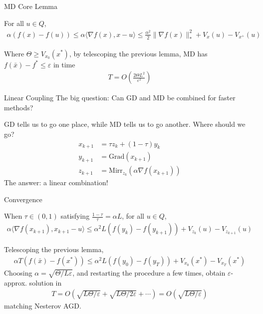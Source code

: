 \documentclass[10pt]{beamer}
\def \ve{\varepsilon}
\newcommand{\mg}[1]{\| #1 \|}
\renewcommand{\grad}{\nabla}
\newcommand{\1}{\mathbbm{1}}
\begin{document}
\begin{frame}{MD Core Lemma}
    \begin{lemma} 
        For all $u \in Q$,
        \begin{align*}
            \alpha (f(x) - f(u)) \leq \alpha \langle \grad f(x), x-u \rangle \leq \frac{\alpha^2}{2} \mg{\grad f(x)}^2_* + V_x(u) - V_{x^+}(u)
        \end{align*}
    \end{lemma}
    \begin{theorem}[]
        Where $\Theta \geq V_{x_0}(x^*)$, by telescoping the previous lemma, MD has $f(\bar x) - f^* \leq \ve$ in time
        \begin{align*}
            T = O\left(\frac{2\Theta L^2}{\ve^2}\right)
        \end{align*}
    \end{theorem}
\end{frame}
\begin{frame}{Linear Coupling}
    The big question: Can GD and MD be combined for faster methods?

    GD tells us to go one place, while MD tells us to go another. Where should we go?
    \begin{align*}
        x_{k+1} &= \tau z_k + (1-\tau) y_k \\
        y_{k+1} &= \mathrm{Grad}(x_{k+1})\\
        z_{k+1} &= \mathrm{Mirr}_{z_k}(\alpha \grad f(x_{k+1}))
    \end{align*}
    The answer: a linear combination!
\end{frame}

\begin{frame}{Convergence}
    \begin{lemma}[Coupling]
        When $\tau \in (0,1)$ satisfying $ \frac{1-\tau}{\tau} = \alpha L$, for all $u \in Q$, \begin{align*}
         \alpha \langle \grad f(x_{k+1}), x_{k+1}-u \rangle \leq \alpha^2 L(f(y_k) - f(y_{k+1})) + V_{z_k}(u) - V_{z_{k+1}}(u)
        \end{align*}
    \end{lemma}
    \begin{theorem}[]
        Telescoping the previous lemma,
        \begin{align*}
            \alpha T(f(\bar x) - f(x^*)) \leq \alpha^2 L(f(y_0) - f(y_T)) + V_{x_0}(x^*) - V_{x_T}(x^*)
        \end{align*}
        Choosing $\alpha = \sqrt{\Theta/L\ve}$, and restarting the procedure a few times, obtain $\ve$-approx. solution in 
        \begin{align*}
            T = O(\sqrt{L\Theta/\ve} + \sqrt{L\Theta/2\ve} + \cdots) = O(\sqrt{L\Theta/\ve})
        \end{align*}
        matching Nesterov AGD.
    \end{theorem}
\end{frame}
\end{document}
